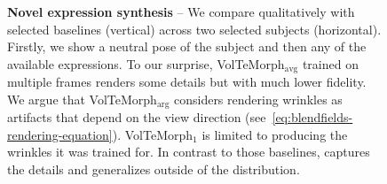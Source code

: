 {
}

\begin{figure}[htb]
  \centering
  \resizebox{\linewidth}{!}{\versionone}
  \caption[Novel expression synthesis capabilities of \blendfields]{\textbf{Novel expression synthesis} --
    We compare qualitatively \blendfields with selected baselines (vertical) across two selected subjects (horizontal).
    Firstly, we show a neutral pose of the subject and then any of the available
    expressions.
    To our surprise, VolTeMorph$_\text{avg}$ trained on multiple frames renders
    some details but with much lower fidelity.
    We argue that VolTeMorph$_\text{arg}$ considers rendering wrinkles as
    artifacts that depend on the view direction
    (see~\cref{eq:blendfields-rendering-equation}).
    VolTeMorph$_1$ is limited to producing the wrinkles it was trained for.
    In contrast to those baselines, \textbf{\blendfields} captures the details and
    generalizes outside of the distribution.
  }
  \label{fig:blendfields-qualitative-comparison}
\end{figure}